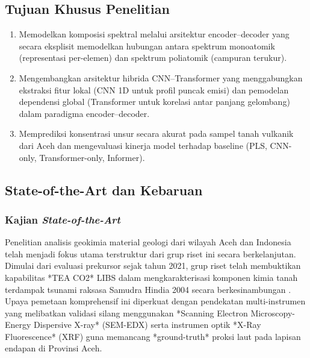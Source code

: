 \documentclass[12pt, a4paper]{article}
\begin{document}
\subsection{Tujuan Khusus Penelitian}
\begin{enumerate}[label=\arabic*.]
    \item Memodelkan komposisi spektral melalui arsitektur encoder–decoder yang secara eksplisit memodelkan hubungan antara spektrum monoatomik (representasi per-elemen) dan spektrum poliatomik (campuran terukur).
    \item Mengembangkan arsitektur hibrida CNN–Transformer yang menggabungkan ekstraksi fitur lokal (CNN 1D untuk profil puncak emisi) dan pemodelan dependensi global (Transformer untuk korelasi antar panjang gelombang) dalam paradigma encoder–decoder.
    \item Memprediksi konsentrasi unsur secara akurat pada sampel tanah vulkanik dari Aceh dan mengevaluasi kinerja model terhadap baseline (PLS, CNN-only, Transformer-only, Informer).
\end{enumerate}


\subsection{State-of-the-Art dan Kebaruan}

\subsubsection{Kajian \textit{State-of-the-Art}}
Penelitian analisis geokimia material geologi dari wilayah Aceh dan Indonesia telah menjadi fokus utama terstruktur dari grup riset ini secara berkelanjutan. Dimulai dari evaluasi prekursor sejak tahun 2021, grup riset telah membuktikan kapabilitas *TEA CO2* LIBS dalam mengkarakterisasi komponen kimia tanah terdampak tsunami raksasa Samudra Hindia 2004 secara berkesinambungan \citep{sari_new_2021}. Upaya pemetaan komprehensif ini diperkuat dengan pendekatan multi-instrumen yang melibatkan validasi silang menggunakan *Scanning Electron Microscopy-Energy Dispersive X-ray* (SEM-EDX) \citep{sari_new_2021, ramli_elemental_2023-1} serta instrumen optik *X-Ray Fluorescence* (XRF) \citep{mitaphonna_x-ray_2023} guna memancang *ground-truth* proksi laut pada lapisan endapan di Provinsi Aceh.
\end{document}
